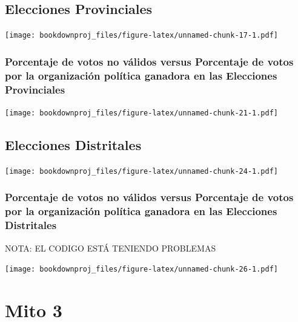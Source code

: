 \documentclass[
]{book}
\theoremstyle{definition}
\theoremstyle{definition}
\theoremstyle{definition}
\theoremstyle{definition}
\theoremstyle{remark}
\begin{document}
\hypertarget{elecciones-provinciales}{%
\section{Elecciones Provinciales}\label{elecciones-provinciales}}

\texttt{[image: bookdownproj\_files/figure-latex/unnamed-chunk-17-1.pdf]}

\hypertarget{porcentaje-de-votos-no-vuxe1lidos-versus-porcentaje-de-votos-por-la-organizaciuxf3n-poluxedtica-ganadora-en-las-elecciones-provinciales}{%
\subsection{Porcentaje de votos no válidos versus Porcentaje de votos por la organización política ganadora en las Elecciones Provinciales}\label{porcentaje-de-votos-no-vuxe1lidos-versus-porcentaje-de-votos-por-la-organizaciuxf3n-poluxedtica-ganadora-en-las-elecciones-provinciales}}

\texttt{[image: bookdownproj\_files/figure-latex/unnamed-chunk-21-1.pdf]}

\hypertarget{elecciones-distritales}{%
\section{Elecciones Distritales}\label{elecciones-distritales}}

\texttt{[image: bookdownproj\_files/figure-latex/unnamed-chunk-24-1.pdf]}

\hypertarget{porcentaje-de-votos-no-vuxe1lidos-versus-porcentaje-de-votos-por-la-organizaciuxf3n-poluxedtica-ganadora-en-las-elecciones-distritales}{%
\subsection{Porcentaje de votos no válidos versus Porcentaje de votos por la organización política ganadora en las Elecciones Distritales}\label{porcentaje-de-votos-no-vuxe1lidos-versus-porcentaje-de-votos-por-la-organizaciuxf3n-poluxedtica-ganadora-en-las-elecciones-distritales}}

NOTA: EL CODIGO ESTÁ TENIENDO PROBLEMAS

\texttt{[image: bookdownproj\_files/figure-latex/unnamed-chunk-26-1.pdf]}

\hypertarget{mito-3}{%
\chapter{Mito 3}\label{mito-3}}
\end{document}

